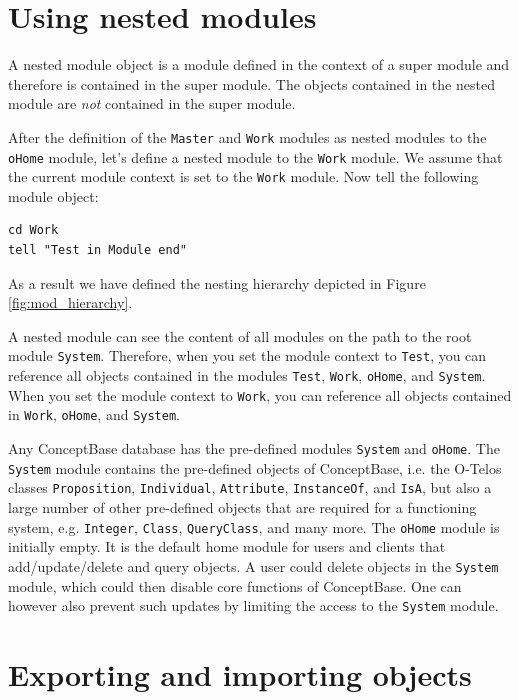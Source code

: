 \section{Using nested modules}
\label{sec:nested_modules}

A nested module object is a module defined in the context of a super module and therefore
is contained in the super module. The objects contained in the nested module
are {\em not\/} contained in the super module.  

After the definition of the {\tt Master} and {\tt Work} modules as nested modules
to the {\tt oHome} module, let's define a nested module to the {\tt Work} module.
We assume that the current module context is set to the  {\tt Work} module.
Now tell the following module object:

\begin{verbatim}
cd Work
tell "Test in Module end"
\end{verbatim}

As a result we have defined the nesting hierarchy depicted in Figure \ref{fig:mod_hierarchy}.


A nested module can see the content of all modules on the path to the root module {\tt System}.
Therefore, when you set the
module context to {\tt Test}, you can reference all objects contained
in the modules {\tt Test}, {\tt Work}, {\tt oHome}, and {\tt System}. When you set the module context
to {\tt Work}, you can reference all objects contained in {\tt Work}, {\tt oHome},
and {\tt System}.

Any ConceptBase database has the pre-defined modules {\tt System} and {\tt oHome}. The {\tt System}
module contains the pre-defined objects of ConceptBase, i.e. the O-Telos classes {\tt Proposition},
{\tt Individual}, {\tt Attribute}, {\tt InstanceOf}, and {\tt IsA}, but also
a large number of other pre-defined objects that are required for a functioning system,
e.g. {\tt Integer}, {\tt Class}, {\tt QueryClass}, and many more.
The {\tt oHome} module is initially empty. It is the default home module
for users and clients that add/update/delete and query objects. A user could delete objects in
the {\tt System} module, which could then disable core functions of ConceptBase. 
One can however also prevent such updates by limiting the access to the {\tt System}
module. 


\section{Exporting and importing objects}

